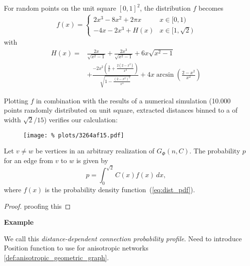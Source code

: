 For random points on the unit square $[0,1]^2$, the distribution $f$
becomes
  \begin{align}\label{eq:dist_pdf}
    f(x) = \begin{cases} 2x^3 -8x^2 + 2\pi x & x \in [0,1) \\ %
                         - 4x -2x^3 + H(x)   &  x \in [1,\sqrt{2}) %
           \end{cases}
  \end{align}
  with
  \begin{align*}
    H(x) = 
      & \frac{2x}{\sqrt{x^2-1}} + \frac{2 x^3}{\sqrt{x^2-1}} + 
        6x \sqrt{x^2-1} \\
      & + \frac{-2 x^2 \left(\frac{2}{x} + 
          \frac{2 (2 - x^2)}{x^3}\right)}{\sqrt{1 - \frac{(2 -
            x^2)^2}{x^4}}} 
        + 4 x \operatorname{arcsin}\left(\frac{2 -x^2}{x^2}\right)
  \end{align*}

Plotting $f$ in combination with the results of a numerical simulation
(10.000 points randomly distributed on unit square, extracted
distances binned to a of width $\sqrt{2}/15$) verifies our calculation: 

\begin{figure}[h] \centering
  \texttt{[image: \%
    plots/3264af15.pdf]}%
  \label{fig:distance_distribution}
\end{figure}

\begin{proposition} Let $v \neq w$ be vertices in an arbitrary
  realization of $G_{\Phi}(n,C)$. The probability $p$ for an edge
  from $v$ to $w$ is given by 
  \[
    p = \int_0^{\sqrt{2}} C(x) f(x) \, dx,
  \]
  where $f(x)$ is the probability density function~(\ref{eq:dist_pdf}).
\end{proposition}
%
\begin{proof}
  proofing this
\end{proof}

\textbf{Example} 

We call this \textit{distance-dependent connection probability profile}. 
Need to introduce Position function to use for anisotropic networks
\ref{def:anisotropic_geometric_graph}.





